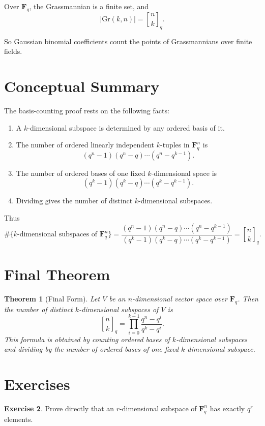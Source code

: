 \documentclass[11pt]{article}
\newtheorem{theorem}{Theorem}[section]
\theoremstyle{definition}
\newtheorem{exercise}[theorem]{Exercise}
\theoremstyle{remark}
\newcommand{\F}{\mathbf{F}}
\newcommand{\Gr}{\mathrm{Gr}}
\newcommand{\qbinom}[2]{\genfrac{[}{]}{0pt}{}{#1}{#2}_q}
\begin{document}
	Over \(\F_q\), the Grassmannian is a finite set, and
	\[
	|\Gr(k,n)|=\qbinom{n}{k}.
	\]
	
	So Gaussian binomial coefficients count the points of Grassmannians over finite fields.
	
	\section{Conceptual Summary}
	
	The basis-counting proof rests on the following facts:
	
	\begin{enumerate}[label=\arabic*.]
		\item A \(k\)-dimensional subspace is determined by any ordered basis of it.
		\item The number of ordered linearly independent \(k\)-tuples in \(\F_q^n\) is
		\[
		(q^n-1)(q^n-q)\cdots(q^n-q^{k-1}).
		\]
		\item The number of ordered bases of one fixed \(k\)-dimensional space is
		\[
		(q^k-1)(q^k-q)\cdots(q^k-q^{k-1}).
		\]
		\item Dividing gives the number of distinct \(k\)-dimensional subspaces.
	\end{enumerate}
	
	Thus
	\[
	\boxed{
		\#\{\text{\(k\)-dimensional subspaces of }\F_q^n\}
		=
		\frac{(q^n-1)(q^n-q)\cdots(q^n-q^{k-1})}
		{(q^k-1)(q^k-q)\cdots(q^k-q^{k-1})}
		=
		\qbinom{n}{k}.
	}
	\]
	
	\section{Final Theorem}
	
	\begin{theorem}[Final Form]
		Let \(V\) be an \(n\)-dimensional vector space over \(\F_q\). Then the number of distinct \(k\)-dimensional subspaces of \(V\) is
		\[
		\boxed{
			\qbinom{n}{k}
			=
			\prod_{i=0}^{k-1}\frac{q^n-q^i}{q^k-q^i}
		}.
		\]
		This formula is obtained by counting ordered bases of \(k\)-dimensional subspaces and dividing by the number of ordered bases of one fixed \(k\)-dimensional subspace.
	\end{theorem}
	
	\section{Exercises}
	
	\begin{exercise}
		Prove directly that an \(r\)-dimensional subspace of \(\F_q^n\) has exactly \(q^r\) elements.
	\end{exercise}
	
\end{document}
